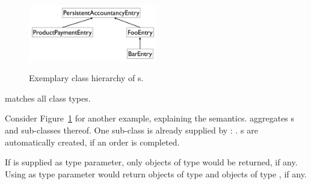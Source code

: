 \begin{figure}
	\centering
  \includegraphics[width=0.5\textwidth]{images/type_matches.pdf}
	\label{matches}
	\caption[Example for a type hierarchy.]{Exemplary class hierarchy of s.}
\end{figure}
 matches all class types.

Consider Figure~\ref{matches} for another example, explaining the  semantics.
 aggregates s and sub-classes thereof.
One sub-class is already supplied by \salespoint{}: .
s are automatically created, if an order is completed.

If  is supplied as type parameter, only objects of type  would be returned, if any.
Using  as type parameter would return objects of type  and objects of type , if any.
	

